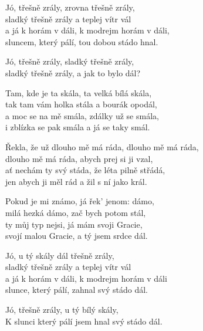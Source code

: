 \ve{}
Jó, třešně zrály, zrovna třešně zrály,\\
sladký třešně zrály a teplej vítr vál\\
a já k horám v dáli, k modrejm horám v dáli,\\
sluncem, který pálí, tou dobou stádo hnal.

\cho{}
Jó, třešně zrály, sladký třešně zrály,\\
sladký třešně zrály, a jak to bylo dál?

\ve{}
Tam, kde je ta skála, ta velká bílá skála,\\
tak tam vám holka stála a bourák opodál,\\
  a moc se na mě smála, zdálky už se smála,\\
     i zblízka se pak smála a já se taky smál.
     
\cho{}

\ve{}
Řekla, že už dlouho mě má ráda, dlouho mě má ráda,\\
dlouho mě má ráda, abych prej si ji vzal,\\
 ať nechám ty svý stáda, že léta pilně střádá,\\
 jen abych ji měl rád a žil s ní jako král.

\cho{}
\ve{}
Pokud je mi známo, já řek' jenom: dámo,\\
 milá hezká dámo, zač bych potom stál,\\
 ty můj typ nejsi, já mám svoji Gracie,\\
 svojí malou Gracie, a tý jsem srdce dál.

 \cho{}
 \ve{}
 Jó, u tý skály dál třešně zrály,\\
 sladký třešně zrály a teplej vítr vál      \\
 a já k horám v dáli, k modrejm horám v dáli \\
 slunce, který pálí, zahnal svý stádo dál.

\cho{}
Jó, třešně zrály, u tý bílý skály,\\
K slunci který pálí jsem hnal svý stádo dál.


\esong{}